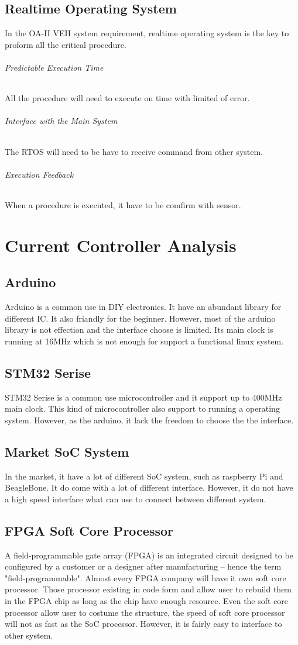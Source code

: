 \documentclass[12pt,article]{memoir}
\begin{document}
\section{Realtime Operating System}
In the OA-II VEH system requirement, realtime operating system is the key to proform all the critical procedure.
\subparagraph{Predictable Execution Time}All the procedure will need to execute on time with limited of error.
\subparagraph{Interface with the Main System}The RTOS will need to be have to receive command from other system.
\subparagraph{Execution Feedback}When a procedure is executed, it have to be comfirm with sensor.
\newpage
\chapter{Current Controller Analysis}
\section{Arduino}
Arduino is a common use in DIY electronics. It have an abundant library for different IC. It also friandly for the beginner. However, most of the arduino library is not effection and the interface choose is limited. Its main clock is running at 16MHz which is not enough for support a functional linux system.
\section{STM32 Serise}
STM32 Serise is a common use microcontroller and it support up to 400MHz main clock. This kind of microcontroller also support to running a operating system. However, as the arduino, it lack the freedom to choose the the interface. 
\section{Market SoC System}
In the market, it have a lot of different SoC system, such as raspberry Pi and BeagleBone. It do come with a lot of different interface. However, it do not have a high speed interface what can use to connect between different system.
\section{FPGA Soft Core Processor}
A field-programmable gate array (FPGA) is an integrated circuit designed to be configured by a customer or a designer after manufacturing – hence the term "field-programmable".\cite{Cite Needed} Almost every FPGA company will have it own soft core processor. Those processor existing in code form and allow user to rebuild them in the FPGA chip as long as the chip have enough resource. Even the soft core processor allow user to costume the structure, the speed of soft core processor will not as fast as the SoC processor. However, it is fairly easy to interface to other system.
\end{document}
